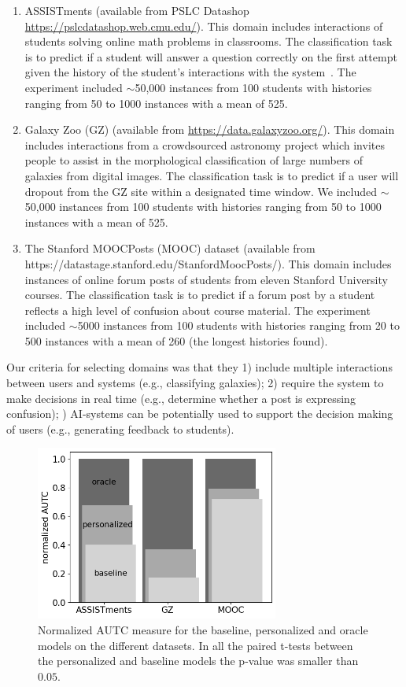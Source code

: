 \documentclass[letterpaper]{article}
\theoremstyle{definition}
\newcommand{\kibitz}[2]{\ifnum\Comments=1{\color{#1}{#2}}\fi}
\newcommand{\li}[1]{\kibitz{brown}{[LL:#1]}}
\begin{document}
\begin{enumerate}
\item   ASSISTments (available from PSLC Datashop \url{https://pslcdatashop.web.cmu.edu/}). This domain
includes interactions of students  solving online math problems in classrooms. The classification task is to predict if a student will answer a question  correctly on the first attempt given the history of the student's interactions with the system~\cite{feng2006addressing}.
The experiment included $\sim$50,000 instances from 100 students with histories ranging from 50 to 1000 instances with a mean of 525.

\item   Galaxy Zoo  (GZ)    (available from \url{https://data.galaxyzoo.org/}). This domain includes interactions from a crowdsourced astronomy project which invites people to assist in the morphological classification of large numbers of galaxies from digital images.  The classification task is to predict if a user
will dropout from the GZ site within a designated time window. We included $\sim$50,000 instances from 100 students with histories ranging from 50 to 1000 instances with a mean of 525.


\item The Stanford MOOCPosts (MOOC) dataset (available from https://datastage.stanford.edu/StanfordMoocPosts/). This domain  includes instances of   online forum posts of students from eleven Stanford University   courses. The  classification task is to predict if a forum post by a student reflects a high level of confusion about course material. The experiment included $\sim$5000 instances from 100 students with histories ranging from 20 to 500 instances with a mean of 260 (the longest histories found).

\end{enumerate}
Our criteria for selecting domains was that they 1) include multiple interactions between users and systems (e.g., classifying galaxies); 2) require  the system to make decisions in real time (e.g., determine whether a post is expressing confusion); \li{In this example the system is making decisions in real time, not the user. Maybe you meant that the system has to make decisions in real time?} 3) AI-systems can be potentially used to support the decision making of users (e.g., generating feedback to students).
\begin{figure}[t]
\centering
\includegraphics[width=8cm]{bar_graph}
\caption{Normalized AUTC measure for the baseline, personalized and oracle models on the different datasets. In all the paired t-tests between the personalized and baseline models the p-value was smaller than $0.05$.}
\label{fig:bar_graph}
\end{figure}
\end{document}
